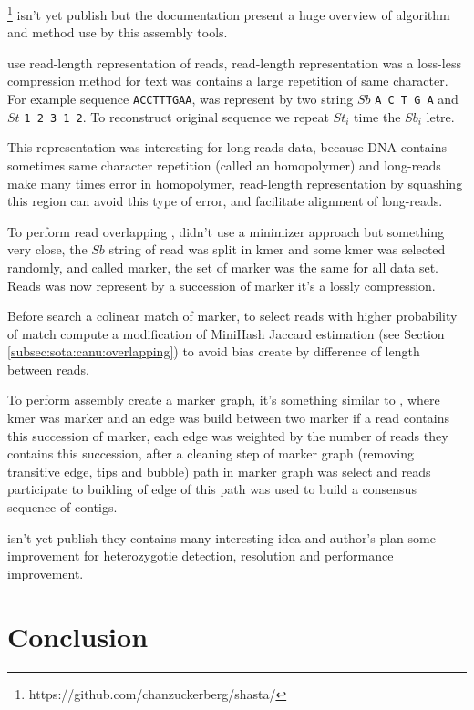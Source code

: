 \documentclass[main]{subfiles}
\begin{document}
\newcommand{\shasta}{}

\shasta\footnote{https://github.com/chanzuckerberg/shasta/} isn't yet publish but the documentation present a huge overview of algorithm and method use by this assembly tools.

\shasta use read-length representation of reads, read-length representation was a loss-less compression method for text was contains a large repetition of same character. For example sequence \texttt{ACCTTTGAA}, was represent by two string $Sb$ \texttt{A C T G A} and $St$ \texttt{1 2 3 1 2}. To reconstruct original sequence we repeat $St_i$ time the $Sb_i$ letre.

This representation was interesting for long-reads data, because DNA contains sometimes same character repetition (called an homopolymer) and long-reads make many times error in homopolymer, read-length representation by squashing this region can avoid this type of error, and facilitate alignment of long-reads.

To perform read overlapping \shasta, didn't use a minimizer approach but something very close, the $Sb$ string of read was split in kmer and some kmer was selected randomly, and called marker, the set of marker was the same for all data set. Reads was now represent by a succession of marker it's a lossly compression.

Before search a colinear match of marker, to select reads with higher probability of match \shasta compute a modification of MiniHash Jaccard estimation (see Section \ref{subsec:sota:canu:overlapping}) to avoid bias create by difference of length between reads.

To perform assembly \shasta create a marker graph, it's something similar to \DBG, where kmer was marker and an edge was build between two marker if a read contains this succession of marker, each edge was weighted by the number of reads they contains this succession, after a cleaning step of marker graph (removing transitive edge, tips and bubble) path in marker graph was select and reads participate to building of edge of this path was used to build a consensus sequence of contigs.

\shasta isn't yet publish they contains many interesting idea and author's plan some improvement for heterozygotie detection, resolution and performance improvement.

\section{Conclusion}
\end{document}

